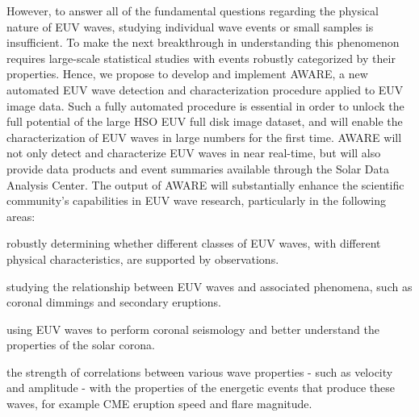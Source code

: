 However, to answer all of the fundamental questions regarding the
physical nature of EUV waves, studying individual wave events or small
samples is insufficient. To make the next breakthrough in
understanding this phenomenon requires large-scale statistical studies
with events robustly categorized by their properties.  Hence, we
propose to develop and implement AWARE, a new automated EUV wave
detection and characterization procedure applied to EUV image
data. Such a fully automated procedure is essential in order to unlock
the full potential of the large HSO EUV full disk image dataset, and
will enable the characterization of EUV waves in large numbers for the
first time. AWARE will not only detect and characterize EUV waves in
near real-time, but will also provide data products and event
summaries available through the Solar Data Analysis Center.  The
output of AWARE will substantially enhance the scientific community’s
capabilities in EUV wave research, particularly in the following
areas: 

robustly determining whether different classes of EUV waves,
with different physical characteristics, are supported by
observations.  

studying the relationship between EUV waves and
associated phenomena, such as coronal dimmings and secondary
eruptions.  

using EUV waves to perform coronal seismology and better
understand the properties of the solar corona.  

the strength of
correlations between various wave properties - such as velocity and
amplitude - with the properties of the energetic events that produce
these waves, for example CME eruption speed and flare magnitude.
